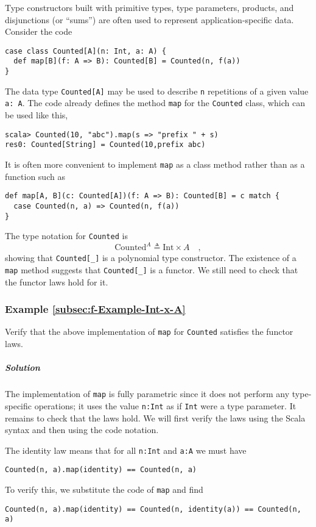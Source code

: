 Type constructors built with primitive types,
type parameters, products, and disjunctions (or \textsf{``}sums\textsf{''}) are often
used to represent application-specific data. Consider the code
\begin{lstlisting}
case class Counted[A](n: Int, a: A) {
  def map[B](f: A => B): Counted[B] = Counted(n, f(a))
}
\end{lstlisting}
The data type \lstinline!Counted[A]! may be used to describe \lstinline!n!
repetitions of a given value \lstinline!a: A!. The code already defines
the  method \lstinline!map! for the \lstinline!Counted! class, which
can be used like this,
\begin{lstlisting}
scala> Counted(10, "abc").map(s => "prefix " + s)
res0: Counted[String] = Counted(10,prefix abc) 
\end{lstlisting}
It is often more convenient to implement \lstinline!map! as a class
method rather than as a function such as
\begin{lstlisting}
def map[A, B](c: Counted[A])(f: A => B): Counted[B] = c match {
  case Counted(n, a) => Counted(n, f(a))
}
\end{lstlisting}

The type notation for \lstinline!Counted! is
\[
\text{Counted}^{A}\triangleq\text{Int}\times A\quad,
\]
showing that \lstinline!Counted[_]! is a polynomial
type constructor. The existence of a \lstinline!map! method suggests
that \lstinline!Counted[_]! is a functor. We still need to check
that the functor laws hold for it.

\subsubsection{Example \label{subsec:f-Example-Int-x-A}\ref{subsec:f-Example-Int-x-A}}

Verify that the above implementation of \lstinline!map! for \lstinline!Counted!
satisfies the functor laws. 

\subparagraph{Solution}

The implementation of \lstinline!map! is fully parametric since it
does not perform any type-specific operations; it uses the value \lstinline!n:Int!
as if \lstinline!Int! were a type parameter. It remains to check
that the laws hold. We will first verify the laws using the Scala
syntax and then using the code notation.

The identity law means that for all \lstinline!n:Int! and \lstinline!a:A!
we must have
\begin{lstlisting}
Counted(n, a).map(identity) == Counted(n, a)
\end{lstlisting}
To verify this, we substitute the code of \lstinline!map! and find
\begin{lstlisting}
Counted(n, a).map(identity) == Counted(n, identity(a)) == Counted(n, a)
\end{lstlisting}

